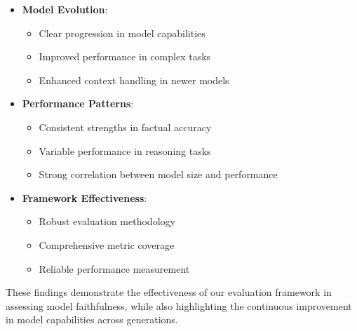\begin{itemize}
    \item \textbf{Model Evolution}:
    \begin{itemize}
        \item Clear progression in model capabilities
        \item Improved performance in complex tasks
        \item Enhanced context handling in newer models
    \end{itemize}

    \item \textbf{Performance Patterns}:
    \begin{itemize}
        \item Consistent strengths in factual accuracy
        \item Variable performance in reasoning tasks
        \item Strong correlation between model size and performance
    \end{itemize}

    \item \textbf{Framework Effectiveness}:
    \begin{itemize}
        \item Robust evaluation methodology
        \item Comprehensive metric coverage
        \item Reliable performance measurement
    \end{itemize}
\end{itemize}

These findings demonstrate the effectiveness of our evaluation framework in assessing model faithfulness, while also highlighting the continuous improvement in model capabilities across generations.
